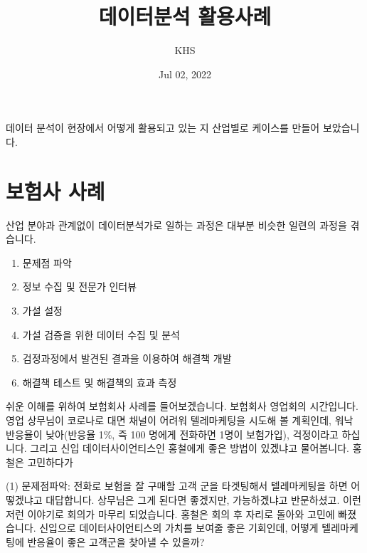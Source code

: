 \documentclass[letterpaper,10pt,english]{jupyterBook}
\title{데이터분석 활용사례}
\date{Jul 02, 2022}
\author{KHS}
\begin{document}
\pagestyle{empty}
\sphinxmaketitle
\pagestyle{plain}
\sphinxtableofcontents
\pagestyle{normal}
\label{\detokenize{chapter3/3.1.0_Use_Case::doc}}


\sphinxAtStartPar
데이터 분석이 현장에서 어떻게 활용되고 있는 지 산업별로 케이스를 만들어 보았습니다.


\part{보험사 사례}
\label{\detokenize{chapter3/3.1.1_Use_Case:id1}}\label{\detokenize{chapter3/3.1.1_Use_Case::doc}}
\sphinxAtStartPar
산업 분야과 관계없이 데이터분석가로 일하는 과정은 대부분 비슷한 일련의 과정을 겪습니다.
\begin{enumerate}
%
\item {} 
\sphinxAtStartPar
문제점 파악

\item {} 
\sphinxAtStartPar
정보 수집 및 전문가 인터뷰

\item {} 
\sphinxAtStartPar
가설 설정

\item {} 
\sphinxAtStartPar
가설 검증을 위한 데이터 수집 및 분석

\item {} 
\sphinxAtStartPar
검정과정에서 발견된 결과을 이용하여 해결책 개발

\item {} 
\sphinxAtStartPar
해결책 테스트 및 해결책의 효과 측정

\end{enumerate}

\sphinxAtStartPar
쉬운 이해를 위하여 보험회사 사례를 들어보겠습니다. 보험회사 영업회의 시간입니다. 영업 상무님이 코로나로 대면 채널이 어려워 텔레마케팅을 시도해 볼 계획인데, 워낙 반응율이 낮아(반응율 1\%, 즉 100 명에게 전화하면 1명이 보험가입), 걱정이라고 하십니다. 그리고 신입 데이터사이언티스인 홍철에게 좋은 방법이 있겠냐고 물어봅니다. 홍철은 고민하다가

\sphinxAtStartPar
(1) 문제점파악: 전화로 보험을 잘 구매할 고객 군을 타겟팅해서 텔레마케팅을 하면 어떻겠냐고 대답합니다. 상무님은 그게 된다면 좋겠지만, 가능하겠냐고 반문하셨고. 이런 저런 이야기로 회의가 마무리 되었습니다. 홍철은 회의 후 자리로 돌아와 고민에 빠졌습니다. 신입으로 데이터사이언티스의 가치를 보여줄 좋은 기회인데, 어떻게 텔레마케팅에 반응율이 좋은 고객군을 찾아낼 수 있을까?
\end{document}
